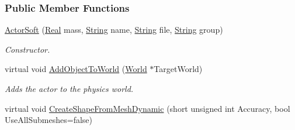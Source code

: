 \subsubsection*{Public Member Functions}
\begin{DoxyCompactItemize}
\item 
\hyperlink{classphys_1_1ActorSoft_af766f6898fb80de4ab98012372a5e6f8}{ActorSoft} (\hyperlink{namespacephys_af7eb897198d265b8e868f45240230d5f}{Real} mass, \hyperlink{namespacephys_aa03900411993de7fbfec4789bc1d392e}{String} name, \hyperlink{namespacephys_aa03900411993de7fbfec4789bc1d392e}{String} file, \hyperlink{namespacephys_aa03900411993de7fbfec4789bc1d392e}{String} group)
\begin{DoxyCompactList}\small\item\em Constructor. \item\end{DoxyCompactList}\item 
virtual void \hyperlink{classphys_1_1ActorSoft_a5f97915d1cda0d048853718714a26d93}{AddObjectToWorld} (\hyperlink{classphys_1_1World}{World} $\ast$TargetWorld)
\begin{DoxyCompactList}\small\item\em Adds the actor to the physics world. \item\end{DoxyCompactList}\item 
\hypertarget{classphys_1_1ActorSoft_a65e5590d1fe4c11e2214d5e6a3d1fc96}{
virtual void \hyperlink{classphys_1_1ActorSoft_a65e5590d1fe4c11e2214d5e6a3d1fc96}{CreateShapeFromMeshDynamic} (short unsigned int Accuracy, bool UseAllSubmeshes=false)}
\label{classphys_1_1ActorSoft_a65e5590d1fe4c11e2214d5e6a3d1fc96}


\end{DoxyCompactItemize}
